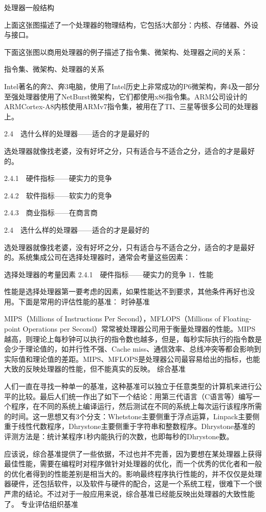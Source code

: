 \documentclass[12pt,UTF8]{ctexbook}
\begin{document}
处理器一般结构

上面这张图描述了一个处理器的物理结构，它包括3大部分：内核、存储器、外设与接口。

下面这张图以商用处理器的例子描述了指令集、微架构、处理器之间的关系：

指令集、微架构、处理器的关系

Intel著名的奔2、奔3电脑，使用了Intel历史上非常成功的P6微架构，奔4及一部分至强处理器使用了NetBurst微架构，它们都使用x86指令集。ARM公司设计的ARMCortex-A8内核使用ARMv7指令集，被用在了TI、三星等很多公司的处理器上。


2.4　选什么样的处理器——适合的才是最好的

选处理器就像找老婆，没有好坏之分，只有适合与不适合之分，适合的才是最好的。

2.4.1　硬件指标——硬实力的竞争

2.4.2　软件指标——软实力的竞争

2.4.3　商业指标——在商言商


2.4　选什么样的处理器——适合的才是最好的

选处理器就像找老婆，没有好坏之分，只有适合与不适合之分，适合的才是最好的。系统集成公司在选择处理器时，通常会考量这些因素：

选择处理器的考量因素
2.4.1　硬件指标——硬实力的竞争
1．性能

性能是选择处理器第一要考虑的因素，如果性能达不到要求，其他条件再好也没用。下面是常用的评估性能的基准：
时钟基准

MIPS（Millions of Instructions Per Second），MFLOPS（Millions of Floating-point Operations per Second）常常被处理器公司用于衡量处理器的性能。MIPS越高，则理论上每秒钟可以执行的指令数也越多，但是，每秒实际执行的指令数是会少于理论值的，如并行性不强、Cache miss、通信效率、总线冲突等都会影响到实际值和理论值的差距。MIPS、MFLOPS是处理器公司最容易给出的指标，也能大致的反映处理器的性能，但不能真实的反映。
综合基准

人们一直在寻找一种单一的基准，这种基准可以独立于任意类型的计算机来进行公平的比较。最后人们统一作出了如下一个结论：用第三代语言（C语言等）编写一个程序，在不同的系统上编译运行，然后测试在不同的系统上每次运行该程序所需的时间。这一思想又有3个分支：Whetstone主要侧重于浮点运算，Linpack主要侧重于线性代数程序，Dhrystone主要侧重于字符串和整数程序。Dhrystone基准的评测方法是：统计某程序1秒内能执行的次数，也即每秒的Dhrystone数。

应该说，综合基准提供了一些依据，不过也并不完善，因为要想在某处理器上获得最佳性能，需要在编程时对程序做针对处理器的优化，而一个优秀的优化者和一般的优化者得到的性能差别是相当大的。影响最终程序执行性能的，并不仅仅是处理器硬件，还包括软件，以及软件与硬件的配合，这是一个系统工程，很难下一个很严肃的结论。不过对于一般应用来说，综合基准已经能反映出处理器的大致性能了。
专业评估组织基准
\end{document}
